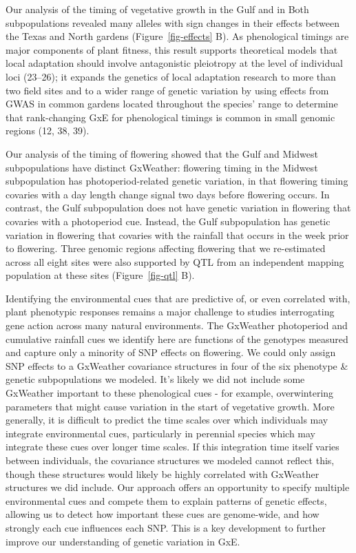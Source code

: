 \documentclass[
  9pt,
  twocolumn,
  twoside]{pnas-new}
\begin{document}
Our analysis of the timing of vegetative growth in the Gulf and in Both
subpopulations revealed many alleles with sign changes in their effects
between the Texas and North gardens (Figure~\ref{fig-effects} B). As
phenological timings are major components of plant fitness, this result
supports theoretical models that local adaptation should involve
antagonistic pleiotropy at the level of individual loci (23--26); it
expands the genetics of local adaptation research to more than two field
sites and to a wider range of genetic variation by using effects from
GWAS in common gardens located throughout the species' range to
determine that rank-changing GxE for phenological timings is common in
small genomic regions (12, 38, 39).

Our analysis of the timing of flowering showed that the Gulf and Midwest
subpopulations have distinct GxWeather: flowering timing in the Midwest
subpopulation has photoperiod-related genetic variation, in that
flowering timing covaries with a day length change signal two days
before flowering occurs. In contrast, the Gulf subpopulation does not
have genetic variation in flowering that covaries with a photoperiod
cue. Instead, the Gulf subpopulation has genetic variation in flowering
that covaries with the rainfall that occurs in the week prior to
flowering. Three genomic regions affecting flowering that we
re-estimated across all eight sites were also supported by QTL from an
independent mapping population at these sites (Figure~\ref{fig-qtl} B).

Identifying the environmental cues that are predictive of, or even
correlated with, plant phenotypic responses remains a major challenge to
studies interrogating gene action across many natural environments. The
GxWeather photoperiod and cumulative rainfall cues we identify here are
functions of the genotypes measured and capture only a minority of SNP
effects on flowering. We could only assign SNP effects to a GxWeather
covariance structures in four of the six phenotype \& genetic
subpopulations we modeled. It's likely we did not include some GxWeather
important to these phenological cues - for example, overwintering
parameters that might cause variation in the start of vegetative growth.
More generally, it is difficult to predict the time scales over which
individuals may integrate environmental cues, particularly in perennial
species which may integrate these cues over longer time scales. If this
integration time itself varies between individuals, the covariance
structures we modeled cannot reflect this, though these structures would
likely be highly correlated with GxWeather structures we did include.
Our approach offers an opportunity to specify multiple environmental
cues and compete them to explain patterns of genetic effects, allowing
us to detect how important these cues are genome-wide, and how strongly
each cue influences each SNP. This is a key development to further
improve our understanding of genetic variation in GxE.
\end{document}
